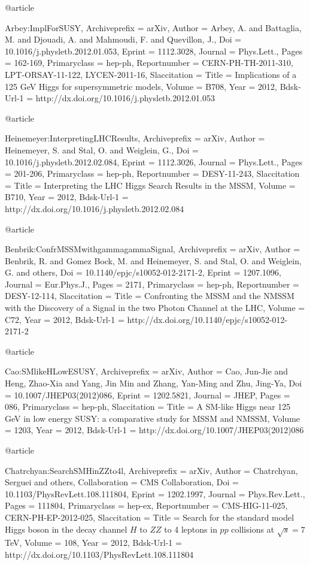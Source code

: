 {{{{{{{{{@article{Arbey:ImplForSUSY,
	Archiveprefix = {arXiv},
	Author = {Arbey, A. and Battaglia, M. and Djouadi, A. and Mahmoudi, F. and Quevillon, J.},
	Doi = {10.1016/j.physletb.2012.01.053},
	Eprint = {1112.3028},
	Journal = {Phys.Lett.},
	Pages = {162-169},
	Primaryclass = {hep-ph},
	Reportnumber = {CERN-PH-TH-2011-310, LPT-ORSAY-11-122, LYCEN-2011-16},
	Slaccitation = {%
	Title = {{Implications of a 125 GeV Higgs for supersymmetric models}},
	Volume = {B708},
	Year = {2012},
	Bdsk-Url-1 = {http://dx.doi.org/10.1016/j.physletb.2012.01.053}}

@article{Heinemeyer:InterpretingLHCResults,
	Archiveprefix = {arXiv},
	Author = {Heinemeyer, S. and Stal, O. and Weiglein, G.},
	Doi = {10.1016/j.physletb.2012.02.084},
	Eprint = {1112.3026},
	Journal = {Phys.Lett.},
	Pages = {201-206},
	Primaryclass = {hep-ph},
	Reportnumber = {DESY-11-243},
	Slaccitation = {%
	Title = {{Interpreting the LHC Higgs Search Results in the MSSM}},
	Volume = {B710},
	Year = {2012},
	Bdsk-Url-1 = {http://dx.doi.org/10.1016/j.physletb.2012.02.084}}

@article{Benbrik:ConfrMSSMwithgammagammaSignal,
	Archiveprefix = {arXiv},
	Author = {Benbrik, R. and Gomez Bock, M. and Heinemeyer, S. and Stal, O. and Weiglein, G. and others},
	Doi = {10.1140/epjc/s10052-012-2171-2},
	Eprint = {1207.1096},
	Journal = {Eur.Phys.J.},
	Pages = {2171},
	Primaryclass = {hep-ph},
	Reportnumber = {DESY-12-114},
	Slaccitation = {%
	Title = {{Confronting the MSSM and the NMSSM with the Discovery of a Signal in the two Photon Channel at the LHC}},
	Volume = {C72},
	Year = {2012},
	Bdsk-Url-1 = {http://dx.doi.org/10.1140/epjc/s10052-012-2171-2}}

@article{Cao:SMlikeHLowESUSY,
	Archiveprefix = {arXiv},
	Author = {Cao, Jun-Jie and Heng, Zhao-Xia and Yang, Jin Min and Zhang, Yan-Ming and Zhu, Jing-Ya},
	Doi = {10.1007/JHEP03(2012)086},
	Eprint = {1202.5821},
	Journal = {JHEP},
	Pages = {086},
	Primaryclass = {hep-ph},
	Slaccitation = {%
	Title = {{A SM-like Higgs near 125 GeV in low energy SUSY: a comparative study for MSSM and NMSSM}},
	Volume = {1203},
	Year = {2012},
	Bdsk-Url-1 = {http://dx.doi.org/10.1007/JHEP03(2012)086}}

@article{Chatrchyan:SearchSMHinZZto4l,
	Archiveprefix = {arXiv},
	Author = {Chatrchyan, Serguei and others},
	Collaboration = {CMS Collaboration},
	Doi = {10.1103/PhysRevLett.108.111804},
	Eprint = {1202.1997},
	Journal = {Phys.Rev.Lett.},
	Pages = {111804},
	Primaryclass = {hep-ex},
	Reportnumber = {CMS-HIG-11-025, CERN-PH-EP-2012-025},
	Slaccitation = {%
	Title = {{Search for the standard model Higgs boson in the decay channel $H$ to $Z Z$ to 4 leptons in $pp$ collisions at $\sqrt{s}=7$ TeV}},
	Volume = {108},
	Year = {2012},
	Bdsk-Url-1 = {http://dx.doi.org/10.1103/PhysRevLett.108.111804}}

}}}}}}}}}}}}}}
